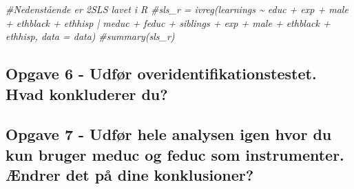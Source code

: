\documentclass[
]{article}
\newenvironment{Shaded}{\begin{snugshade}}{\end{snugshade}}
\newcommand{\CommentTok}[1]{\textcolor[rgb]{0.56,0.35,0.01}{\textit{#1}}}
\begin{document}
\begin{Shaded}
\begin{Highlighting}[]
\CommentTok{\#Nedenstående er 2SLS lavet i R}
\CommentTok{\#sls\_r = ivreg(learnings \textasciitilde{} educ + exp + male + ethblack + ethhisp | meduc + feduc + siblings + exp + male + ethblack + ethhisp, data = data)}
\CommentTok{\#summary(sls\_r)}
\end{Highlighting}
\end{Shaded}

\hypertarget{opgave-6---udfuxf8r-overidentifikationstestet.-hvad-konkluderer-du}{%
\subsection{Opgave 6 - Udfør overidentifikationstestet. Hvad konkluderer
du?}\label{opgave-6---udfuxf8r-overidentifikationstestet.-hvad-konkluderer-du}}

\hypertarget{opgave-7---udfuxf8r-hele-analysen-igen-hvor-du-kun-bruger-meduc-og-feduc-som-instrumenter.-uxe6ndrer-det-puxe5-dine-konklusioner}{%
\subsection{Opgave 7 - Udfør hele analysen igen hvor du kun bruger meduc
og feduc som instrumenter. Ændrer det på dine
konklusioner?}\label{opgave-7---udfuxf8r-hele-analysen-igen-hvor-du-kun-bruger-meduc-og-feduc-som-instrumenter.-uxe6ndrer-det-puxe5-dine-konklusioner}}
\end{document}
